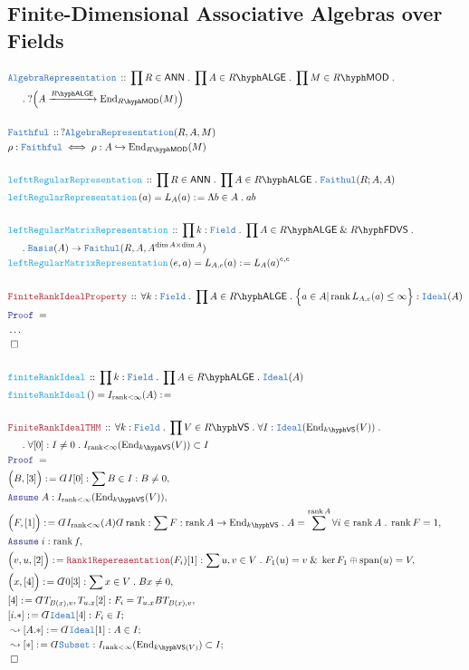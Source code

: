 \documentclass[12pt]{scrartcl}%
\newcommand{\TYPE}[1]{\textcolor{NavyBlue}{\mathtt{#1}}}%
\newcommand{\FUNC}[1]{\textcolor{Cerulean}{\mathtt{#1}}}%
\newcommand{\LOGIC}[1]{\textcolor{Blue}{\mathtt{#1}}}%
\newcommand{\THM}[1]{\textcolor{Maroon}{\mathtt{#1}}}%
\renewcommand{\.}{\; . \;} %
\newcommand{\de}{: \kern 0.1pc =} %
\newcommand{\Act}[1]{\left( #1 \right)} %
\newcommand{\Theorem}[2]{& \THM{#1} \, :: \, #2 \\ & \Proof = \\ } %
\newcommand{\DeclareType}[2]{& \TYPE{#1} \, :: \, #2 \\}%
\newcommand{\DefineType}[3]{& #1 : \TYPE{#2} \iff #3 \\}%
\newcommand{\DeclareFunc}[2]{& \FUNC{#1} \, :: \, #2 \\}%
\newcommand{\DefineNamedFunc}[4]{&  \FUNC{#1}\Act{#2} = #3 \de #4 \\}%
\newcommand{\NewLine}{\\ & \kern 1pc}%
\newcommand{\Page}[1]{ \begin{align*} #1 \end{align*}  }%
\newcommand{ \bd }{ \ByDef }%
\newcommand{\NoProof}{ & \ldots \\ \EndProof}%
\renewcommand{\And}{\; \& \;}%
\newcommand{\End}{\mathrm{End}}%
\newcommand{\ToInj}{\hookrightarrow} %
\newcommand{\Say}[3]{& #1 \de #2 : #3, \\} %
\newcommand{\Conclude}[3]{& #1 \de #2 : #3; \\}%
\newcommand{\DeriveConclude}[3]{& \leadsto #1 \de #2 : #3 ; \\} %
\newcommand{\Assume}[2]{& \LOGIC{Assume} \; #1 : #2, \\} %
\newcommand{\QED}{\; \square} %
\newcommand{\EndProof}{& \QED \\} %
\newcommand{\ByDef}{\rotatebox[origin=c]{-180}{$D$}}%
\newcommand{\Proof}{\LOGIC{Proof} \; } %
\newcommand{\Arrow}[1]{\xrightarrow{#1}}%
\DeclareMathOperator{\rank}{rank} %
\newcommand{\Basis}{\TYPE{Basis}} %
\DeclareMathOperator{\Span}{span} %
\newcommand{\VS}[1]{#1\hyph\mathsf{VS}} %
\newcommand{\FDVS}[1]{#1\hyph\mathsf{FDVS}} %
\newcommand{\LMOD}[1]{#1\hyph\mathsf{MOD}} %
\newcommand{\Field}{\TYPE{Field}}
\newcommand{\Ideal}{\TYPE{Ideal}}
\newcommand{\ANN}{\mathsf{ANN}} %
\newcommand{\LALGE}[1]{#1\hyph\mathsf{ALGE}}%
\begin{document}
\subsection{Finite-Dimensional Associative Algebras over Fields}
\Page{
	\DeclareType{AlgebraRepresentation}{ \prod R \in \ANN \. \prod A \in \LALGE{R} \. \prod M \in \LMOD{R} \. \NewLine \. ?\Big(A \Arrow{\LALGE{R}} \End_{\LMOD{R}}(M) \Big) } 
	\\
	\DeclareType{Faithful}{?\TYPE{AlgebraRepresentation}(R,A,M)}
	\DefineType{\rho}{Faithful}{\rho : A \ToInj \End_{\LMOD{R}}(M)}
	\\
	\DeclareFunc{lefttRegularRepresentation}{ \prod R \in \ANN \. \prod A \in \LALGE{R} \. \TYPE{Faithul}(R;A,A)}
	\DefineNamedFunc{leftRegularRepresentation}{a}{L_A(a)}{\Lambda b \in A \. ab} 
	\\
	\DeclareFunc{leftRegularMatrixRepresentation}{ \prod k : \Field \. \prod A \in \LALGE{R} \And \FDVS{R} \. \NewLine \. \Basis(A)  \to  \TYPE{Faithul}(R,A,A^{\dim A \times \dim A}) }
	\DefineNamedFunc{leftRegularMatrixRepresentation}{e,a}{L_{A,e}(a)}{ {L_A(a)}^{e,e} }
	\\
	\Theorem{FiniteRankIdealProperty}{\forall k : \Field \. \prod A \in \LALGE{R} \. \Big\{ a \in A | \rank L_{A,e}(a) \le \infty  \Big\} : \TYPE{Ideal}(A)}
	\NoProof
	\\
	\DeclareFunc{finiteRankIdeal}{ \prod k : \Field \. \prod A \in \LALGE{R} \. \Ideal(A)  }
	\DefineNamedFunc{finiteRankIdeal}{}{I_{\rank < \infty}(A)}                                                               
	\\
	\Theorem{FiniteRankIdealTHM}{\forall k : \Field \. \prod V \in \VS{R} \. \forall I : \Ideal(\End_{\VS{k}}(V)) \. \NewLine \.  
		\forall [0] : I \neq 0  \.  I_{\rank < \infty}(\End_{\VS{k}}(V)) \subset I  
	}
	\Say{\Big(B,[3]\Big)}{ \bd I [0]}{\sum B \in I : B \neq 0}
	\Assume{A}{I_{\rank < \infty}(\End_{\VS{k}}(V))}
	\Say{\Big(F,[1]\Big)}{\bd I_{\rank < \infty}(A)\bd \rank}{\sum F : \rank A \to \End_{\VS{k}} \. A = \sum^{\rank A} \forall i \in \rank A \. \rank F = 1 }
	\Assume{i}{\rank f}
	\Say{\Big(v,u,[2]\Big)}{\THM{Rank1Reperesentation}(F_i)[1]}{\sum u,v \in V \. F_1(u) = v \And \ker F_1 \oplus \Span(u) = V}   
	\Say{\Big(x,[4]\Big)}{\bd 0 [3]}{\sum x\in V \. Bx \neq 0}  
	\Say{[4]}{\bd T_{B(x),v},T_{u,x}[2]}{F_i = T_{u,x} B T_{B(x),v}}
	\Conclude{[i.*]}{\bd \TYPE{Ideal}[4]}{F_i \in I}
	\DeriveConclude{[A.*]}{\bd \TYPE{Ideal}[1]}{A \in I} 
	\DeriveConclude{[*]}{\bd \TYPE{Subset}}{I_{\rank < \infty}(\End_{\VS{k}(V)}) \subset I}
	\EndProof
}
\end{document}

